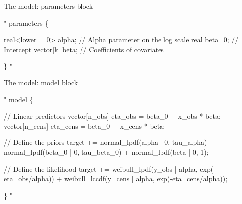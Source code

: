 \documentclass[ignorenonframetext,a4paper]{beamer}
\newenvironment{Shaded}{\begin{snugshade}}{\end{snugshade}}
\newcommand{\StringTok}[1]{\textcolor[rgb]{0.31,0.60,0.02}{#1}}
\begin{document}
\begin{frame}[fragile]{The model: parameters block}

\scriptsize

\begin{Shaded}
\begin{Highlighting}[]
\StringTok{"}
\StringTok{parameters \{}

\StringTok{  real<lower = 0> alpha;           // Alpha parameter on the log scale}
\StringTok{  real beta_0;                     // Intercept}
\StringTok{  vector[k] beta;                  // Coefficients of covariates}

\StringTok{\}}
\StringTok{"}
\end{Highlighting}
\end{Shaded}

\end{frame}

\begin{frame}[fragile]{The model: model block}

\scriptsize

\begin{Shaded}
\begin{Highlighting}[]
\StringTok{"}
\StringTok{model \{}

\StringTok{  // Linear predictors}
\StringTok{  vector[n_obs] eta_obs = beta_0 + x_obs * beta;}
\StringTok{  vector[n_cens] eta_cens = beta_0 + x_cens * beta;}

\StringTok{  // Define the priors}
\StringTok{  target += normal_lpdf(alpha | 0, tau_alpha) +}
\StringTok{            normal_lpdf(beta_0 | 0, tau_beta_0) +}
\StringTok{            normal_lpdf(beta | 0, 1);}

\StringTok{  // Define the likelihood}
\StringTok{  target += weibull_lpdf(y_obs | alpha, exp(-eta_obs/alpha)) +}
\StringTok{            weibull_lccdf(y_cens | alpha, exp(-eta_cens/alpha));}

\StringTok{\}}
\StringTok{"}
\end{Highlighting}
\end{Shaded}

\end{frame}
\end{document}

